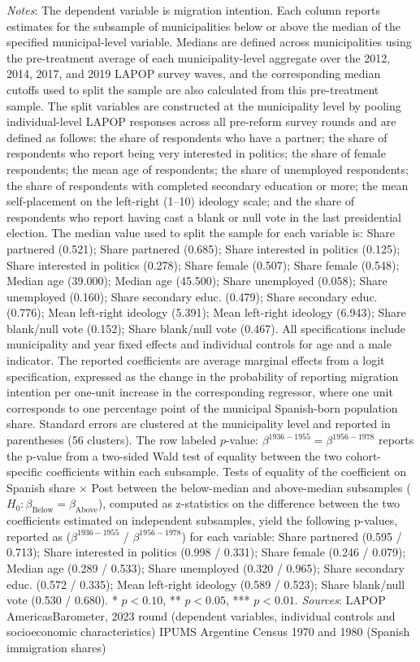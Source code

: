 \begin{table}[!h]
\caption*{\footnotesize \textit{Notes}: The dependent variable is migration intention. Each column reports estimates for the subsample of municipalities below or above the median of the specified municipal-level variable. Medians are defined across municipalities using the pre-treatment average of each municipality-level aggregate over the 2012, 2014, 2017, and 2019 LAPOP survey waves, and the corresponding median cutoffs used to split the sample are also calculated from this pre-treatment sample. The split variables are constructed at the municipality level by pooling individual-level LAPOP responses across all pre-reform survey rounds and are defined as follows: the share of respondents who have a partner; the share of respondents who report being very interested in politics; the share of female respondents; the mean age of respondents; the share of unemployed respondents; the share of respondents with completed secondary education or more; the mean self-placement on the left-right (1--10) ideology scale; and the share of respondents who report having cast a blank or null vote in the last presidential election. The median value used to split the sample for each variable is: Share partnered (0.521); Share partnered (0.685); Share interested in politics (0.125); Share interested in politics (0.278); Share female (0.507); Share female (0.548); Median age (39.000); Median age (45.500); Share unemployed (0.058); Share unemployed (0.160); Share secondary educ. (0.479); Share secondary educ. (0.776); Mean left-right ideology (5.391); Mean left-right ideology (6.943); Share blank/null vote (0.152); Share blank/null vote (0.467). All specifications include municipality and year fixed effects and individual controls for age and a male indicator. The reported coefficients are average marginal effects from a logit specification, expressed as the change in the probability of reporting migration intention per one-unit increase in the corresponding regressor, where one unit corresponds to one percentage point of the municipal Spanish-born population share. Standard errors are clustered at the municipality level and reported in parentheses (56 clusters). The row labeled $p$-value: $\beta^{1936-1955} = \beta^{1956-1978}$ reports the p-value from a two-sided Wald test of equality between the two cohort-specific coefficients within each subsample. Tests of equality of the coefficient on Spanish share $\times$ Post between the below-median and above-median subsamples ($H_0: \beta_{\text{Below}} = \beta_{\text{Above}}$), computed as z-statistics on the difference between the two coefficients estimated on independent subsamples, yield the following p-values, reported as ($\beta^{1936-1955}$ / $\beta^{1956-1978}$) for each variable: Share partnered (0.595 / 0.713); Share interested in politics (0.998 / 0.331); Share female (0.246 / 0.079); Median age (0.289 / 0.533); Share unemployed (0.320 / 0.965); Share secondary educ. (0.572 / 0.335); Mean left-right ideology (0.589 / 0.523); Share blank/null vote (0.530 / 0.680). * $p<0.10$, ** $p<0.05$, *** $p<0.01$. \textit{Sources}:  LAPOP AmericasBarometer, 2023 round (dependent variables, individual controls and socioeconomic characteristics) IPUMS Argentine Census 1970 and 1980 (Spanish immigration shares)}
\end{table}
